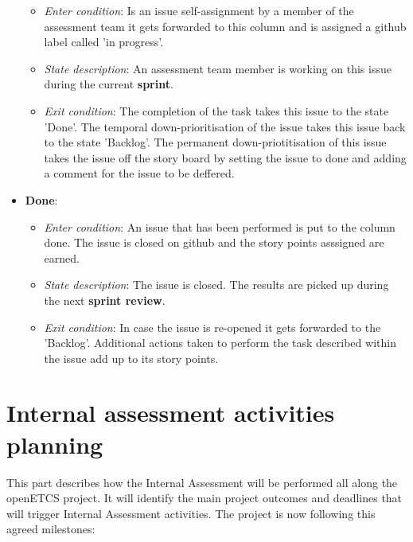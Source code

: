 \documentclass[openetcs]{template/openetcs_article}
\begin{document}
\begin{itemize}
\begin{itemize}
\item \textit{Enter condition}: Is an issue self-assignment by a member of the assessment team it gets forwarded to this column and is assigned a github label called 'in progress'.
\item \textit{State description}: An assessment team member is working on this issue during the current \textbf{sprint}.
\item \textit{Exit condition}: The completion of the task takes this issue to the state 'Done'. The temporal down-prioritisation of the issue takes this issue back to the state 'Backlog'. The permanent down-priotitisation of this issue takes the issue off the story board by setting the issue to done and adding a comment for the issue to be deffered.
\end{itemize}

\item \textbf{Done}: 
\begin{itemize}
\item \textit{Enter condition}: An issue that has been performed is put to the column done. The issue is closed on github and the story points asssigned are earned.
\item \textit{State description}: The issue is closed. The results are picked up during the next \textbf{sprint review}. 
\item \textit{Exit condition}: In case the issue is re-opened it gets forwarded to the 'Backlog'. Additional actions taken to perform the task described within the issue add up to its story points.
\end{itemize}
\end{itemize}


\section{Internal assessment activities planning}
This part describes how the Internal Assessment will be performed all along the openETCS project. It will identify the main project outcomes and deadlines that will trigger Internal Assessment activities. The project is now following this agreed milestones: 
\label{assessmentmilestones}
\end{document}
